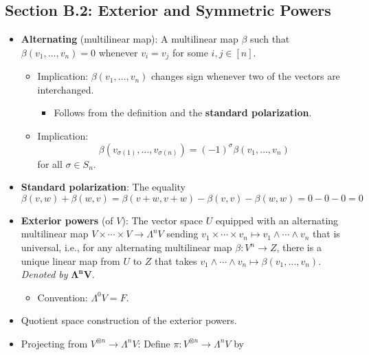 \documentclass[../notes.tex]{subfiles}
\begin{document}
\subsection*{Section B.2: Exterior and Symmetric Powers}
\begin{itemize}
    \item \textbf{Alternating} (multilinear map): A multilinear map $\beta$ such that $\beta(v_1,\dots,v_n)=0$ whenever $v_i=v_j$ for some $i,j\in[n]$.
    \begin{itemize}
        \item Implication: $\beta(v_1,\dots,v_n)$ changes sign whenever two of the vectors are interchanged.
        \begin{itemize}
            \item Follows from the definition and the \textbf{standard polarization}.
        \end{itemize}
        \item Implication:
        \begin{equation*}
            \beta(v_{\sigma(1)},\dots,v_{\sigma(n)}) = (-1)^\sigma\beta(v_1,\dots,v_n)
        \end{equation*}
        for all $\sigma\in S_n$.
    \end{itemize}
    \item \textbf{Standard polarization}: The equality
    \begin{equation*}
        \beta(v,w)+\beta(w,v) = \beta(v+w,v+w)-\beta(v,v)-\beta(w,w)
        = 0-0-0
        = 0
    \end{equation*}
    \item \textbf{Exterior powers} (of $V$): The vector space $U$ equipped with an alternating multilinear map $V\times\cdots\times V\to\Lambda^nV$ sending $v_1\times\cdots\times v_n\mapsto v_1\wedge\cdots\wedge v_n$ that is universal, i.e., for any alternating multilinear map $\beta:V^n\to Z$, there is a unique linear map from $U$ to $Z$ that takes $v_1\wedge\cdots\wedge v_n\mapsto\beta(v_1,\dots,v_n)$. \emph{Denoted by} $\bm{\Lambda^nV}$.
    \begin{itemize}
        \item Convention: $\Lambda^0V=F$.
    \end{itemize}
    \item Quotient space construction of the exterior powers.
    \item Projecting from $V^{\otimes n}\to\Lambda^nV$: Define $\pi:V^{\otimes n}\to\Lambda^nV$ by
    \begin{equation*}

\end{equation*}
\end{itemize}
\end{document}

